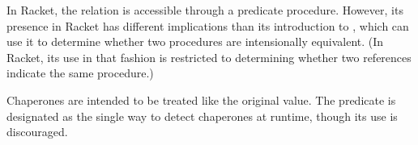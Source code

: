 


In Racket, the  relation is accessible through a predicate procedure.
However, its presence in Racket has different implications than its introduction to \chapcalc, which can use it to determine whether two procedures are intensionally equivalent.
(In Racket, its use in that fashion is restricted to determining whether two references indicate the same procedure.)

Chaperones are intended to be treated like the original value.
The  predicate is designated as the single way to detect chaperones at runtime, though its use is discouraged.



